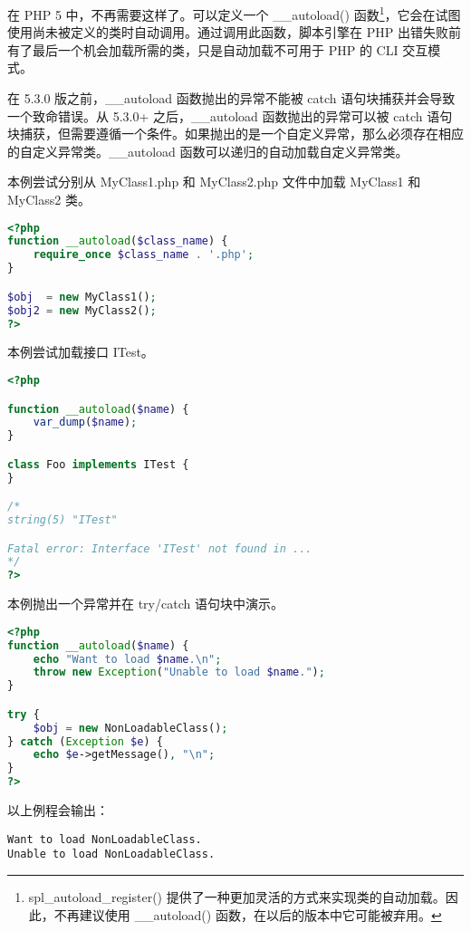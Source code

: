 在 PHP 5 中，不再需要这样了。可以定义一个 \_\_autoload() 函数\footnote{spl\_autoload\_register() 提供了一种更加灵活的方式来实现类的自动加载。因此，不再建议使用 \_\_autoload() 函数，在以后的版本中它可能被弃用。}，它会在试图使用尚未被定义的类时自动调用。通过调用此函数，脚本引擎在 PHP 出错失败前有了最后一个机会加载所需的类，只是自动加载不可用于 PHP 的 CLI 交互模式。

在 5.3.0 版之前，\_\_autoload 函数抛出的异常不能被 catch 语句块捕获并会导致一个致命错误。从 5.3.0+ 之后，\_\_autoload 函数抛出的异常可以被 catch 语句块捕获，但需要遵循一个条件。如果抛出的是一个自定义异常，那么必须存在相应的自定义异常类。\_\_autoload 函数可以递归的自动加载自定义异常类。

本例尝试分别从 MyClass1.php 和 MyClass2.php 文件中加载 MyClass1 和 MyClass2 类。

\begin{lstlisting}[language=PHP]
<?php
function __autoload($class_name) {
    require_once $class_name . '.php';
}

$obj  = new MyClass1();
$obj2 = new MyClass2();
?>
\end{lstlisting}


本例尝试加载接口 ITest。


\begin{lstlisting}[language=PHP]
<?php

function __autoload($name) {
    var_dump($name);
}

class Foo implements ITest {
}

/*
string(5) "ITest"

Fatal error: Interface 'ITest' not found in ...
*/
?>
\end{lstlisting}

本例抛出一个异常并在 try/catch 语句块中演示。




\begin{lstlisting}[language=PHP]
<?php
function __autoload($name) {
    echo "Want to load $name.\n";
    throw new Exception("Unable to load $name.");
}

try {
    $obj = new NonLoadableClass();
} catch (Exception $e) {
    echo $e->getMessage(), "\n";
}
?>
\end{lstlisting}

以上例程会输出：

\begin{verbatim}
Want to load NonLoadableClass.
Unable to load NonLoadableClass.
\end{verbatim}

